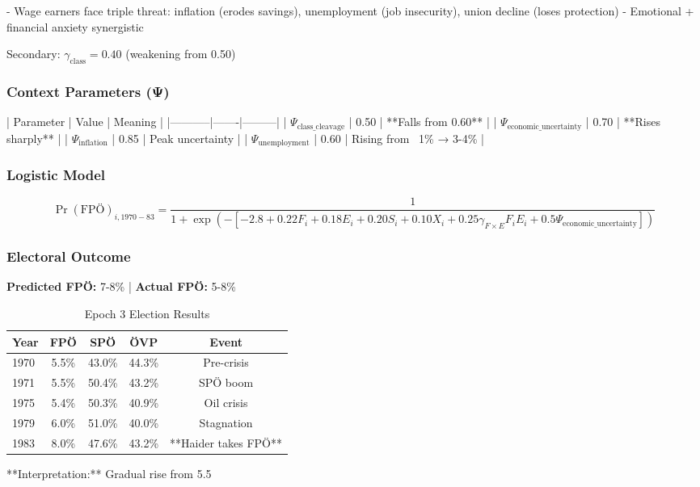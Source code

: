 - Wage earners face triple threat: inflation (erodes savings), unemployment (job insecurity), union decline (loses protection)
- Emotional + financial anxiety synergistic

Secondary: $\gamma_{\text{class}} = 0.40$ (weakening from 0.50)

\subsubsection{Context Parameters (Ψ)}

| Parameter | Value | Meaning |
|-----------|-------|---------|
| $\Psi_{\text{class\_cleavage}}$ | 0.50 | **Falls from 0.60** |
| $\Psi_{\text{economic\_uncertainty}}$ | 0.70 | **Rises sharply** |
| $\Psi_{\text{inflation}}$ | 0.85 | Peak uncertainty |
| $\Psi_{\text{unemployment}}$ | 0.60 | Rising from ~1\% → 3-4\% |

\subsubsection{Logistic Model}

$$\Pr(\text{FPÖ})_{i,1970-83} = \frac{1}{1 + \exp(-[-2.8 + 0.22 F_i + 0.18 E_i + 0.20 S_i + 0.10 X_i + 0.25 \gamma_{F \times E} F_i E_i + 0.5 \Psi_{\text{economic\_uncertainty}}])}$$

\subsubsection{Electoral Outcome}

\textbf{Predicted FPÖ:} 7-8\% | \textbf{Actual FPÖ:} 5-8\%

\begin{table}[h]
\centering
\caption{Epoch 3 Election Results}
\label{tab:epoch3-results}
\begin{tabular}{lcccc}
\toprule
Year & FPÖ & SPÖ & ÖVP & Event \\
\midrule
1970 & 5.5\% & 43.0\% & 44.3\% & Pre-crisis \\
1971 & 5.5\% & 50.4\% & 43.2\% & SPÖ boom \\
1975 & 5.4\% & 50.3\% & 40.9\% & Oil crisis \\
1979 & 6.0\% & 51.0\% & 40.0\% & Stagnation \\
1983 & 8.0\% & 47.6\% & 43.2\% & **Haider takes FPÖ** \\
\bottomrule
\end{tabular}
\end{table}

**Interpretation:** Gradual rise from 5.5%

